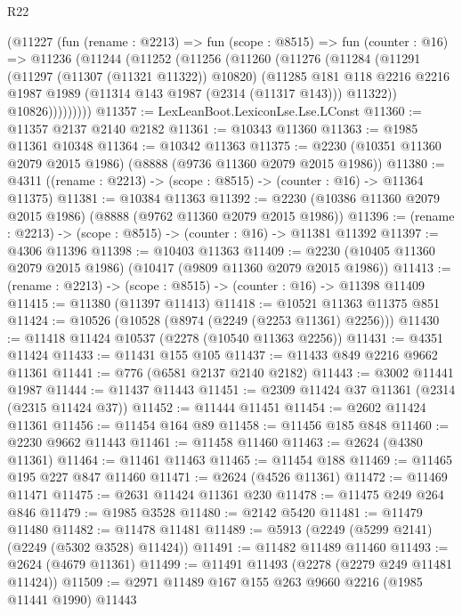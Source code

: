 \begin{lexlean}{R22}
\begin{coremodule}
      (@11227
        (fun (rename : @2213) =>
        fun (scope : @8515) =>
        fun (counter : @16) =>
        @11236
          (@11244
            (@11252
              (@11256
                (@11260
                  (@11276
                    (@11284
                      (@11291
                        (@11297 (@11307 (@11321 @11322)) @10820)
                        (@11285
                          @181
                          @118
                          @2216
                          @2216
                          @1987
                          @1989
                          (@11314 @143 @1987 (@2314 (@11317 @143)))
                          @11322))
                      @10826)))))))))
@11357 := LexLeanBoot.LexiconLse.Lse.LConst
@11360 := @11357 @2137 @2140 @2182
@11361 := @10343 @11360
@11363 := @1985 @11361 @10348
@11364 := @10342 @11363
@11375 := @2230 (@10351 @11360 @2079 @2015 @1986) (@8888 (@9736 @11360 @2079 @2015 @1986))
@11380 := @4311 ((rename : @2213) -> (scope : @8515) -> (counter : @16) -> @11364 @11375)
@11381 := @10384 @11363
@11392 := @2230 (@10386 @11360 @2079 @2015 @1986) (@8888 (@9762 @11360 @2079 @2015 @1986))
@11396 := (rename : @2213) -> (scope : @8515) -> (counter : @16) -> @11381 @11392
@11397 := @4306 @11396
@11398 := @10403 @11363
@11409 := @2230 (@10405 @11360 @2079 @2015 @1986) (@10417 (@9809 @11360 @2079 @2015 @1986))
@11413 := (rename : @2213) -> (scope : @8515) -> (counter : @16) -> @11398 @11409
@11415 := @11380 (@11397 @11413)
@11418 := @10521 @11363 @11375 @851
@11424 := @10526 (@10528 (@8974 (@2249 (@2253 @11361) @2256)))
@11430 := @11418 @11424 @10537 (@2278 (@10540 @11363 @2256))
@11431 := @4351 @11424
@11433 := @11431 @155 @105
@11437 := @11433 @849 @2216 @9662 @11361
@11441 := @776 (@6581 @2137 @2140 @2182)
@11443 := @3002 @11441 @1987
@11444 := @11437 @11443
@11451 := @2309 @11424 @37 @11361 (@2314 (@2315 @11424 @37))
@11452 := @11444 @11451
@11454 := @2602 @11424 @11361
@11456 := @11454 @164 @89
@11458 := @11456 @185 @848
@11460 := @2230 @9662 @11443
@11461 := @11458 @11460
@11463 := @2624 (@4380 @11361)
@11464 := @11461 @11463
@11465 := @11454 @188
@11469 := @11465 @195 @227 @847 @11460
@11471 := @2624 (@4526 @11361)
@11472 := @11469 @11471
@11475 := @2631 @11424 @11361 @230
@11478 := @11475 @249 @264 @846
@11479 := @1985 @3528
@11480 := @2142 @5420
@11481 := @11479 @11480
@11482 := @11478 @11481
@11489 := @5913 (@2249 (@5299 @2141) (@2249 (@5302 @3528) @11424))
@11491 := @11482 @11489 @11460
@11493 := @2624 (@4679 @11361)
@11499 := @11491 @11493 (@2278 (@2279 @249 @11481 @11424))
@11509 := @2971 @11489 @167 @155 @263 @9660 @2216 (@1985 @11441 @1990) @11443

\end{coremodule}
\end{lexlean}
